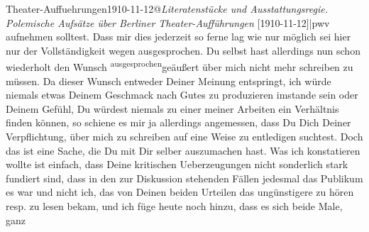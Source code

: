 \begin{ledgroupsized}[t]{13cm}
{                  Theater-Auffuehrungen1910-11-12@\strich\emph{Literatenstücke und Ausstattungsregie. Polemische Aufsätze über Berliner Theater-Aufführungen} {[}1910-11-12{]}|pwv} aufnehmen solltest. Dass mir dies jederzeit so ferne lag wie nur
               möglich sei hier nur der Vollständigkeit wegen ausgesprochen. Du selbst hast
               allerdings nun schon wiederholt den Wunsch \substVorne{}\textsuperscript{ausgesprochen}{\allowbreak}\substDazwischen{}geäußert\substHinten{} über mich nicht mehr schreiben zu müssen. Da dieser Wunsch entweder Deiner
               Meinung entspringt, ich würde niemals etwas Deinem Geschmack nach Gutes zu
               produzieren imstande sein oder Deinem Gefühl, Du würdest niemals zu einer meiner
               Arbeiten ein Verhältnis finden können, so schiene es mir ja allerdings angemessen,
               dass Du Dich Deiner Verpflichtung, über mich zu schreiben \introOben{}auf eine
                  Weise\introOben{} zu entledigen suchtest. Doch das ist eine Sache, die Du mit Dir selber
               auszumachen hast. Was ich konstatieren wollte ist einfach, dass Deine kritischen
               Ueberzeugungen nicht sonderlich stark fundiert sind, dass in den zur Diskussion
               stehenden Fällen
               jedesmal das Publikum es war und nicht ich, das von Deinen beiden Urteilen das ungünstigere zu
               hören resp. zu lesen bekam, und ich füge {\pb}heute noch hinzu, dass es sich beide Male, ganz

\end{ledgroupsized}
